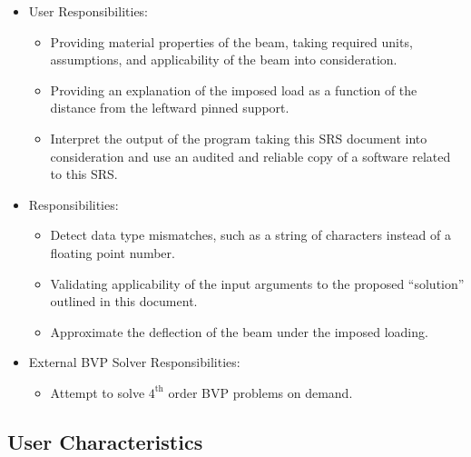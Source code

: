 \documentclass[12pt]{article}
\begin{document}
\begin{itemize}
    \item User Responsibilities:
          \begin{itemize}

              \item Providing material properties of the beam, taking required
                    units, assumptions, and applicability of the beam into
                    consideration.

              \item Providing an explanation of the imposed load as a function
                    of the distance from the leftward pinned support.

              \item Interpret the output of the program taking this SRS document
                    into consideration and use an audited and reliable copy of a
                    software related to this SRS.

          \end{itemize}

    \item \progname{} Responsibilities:
          \begin{itemize}

              \item Detect data type mismatches, such as a string of characters
                    instead of a floating point number.

              \item Validating applicability of the input arguments to the
                    proposed ``solution'' outlined in this document.

              \item Approximate the deflection of the beam under the imposed
                    loading.

          \end{itemize}

    \item External BVP Solver Responsibilities:
          \begin{itemize}

              \item Attempt to solve $4^{\text{th}}$ order BVP problems on demand.

          \end{itemize}
\end{itemize}

\subsection{User Characteristics}
\label{SecUserCharacteristics}
\end{document}

